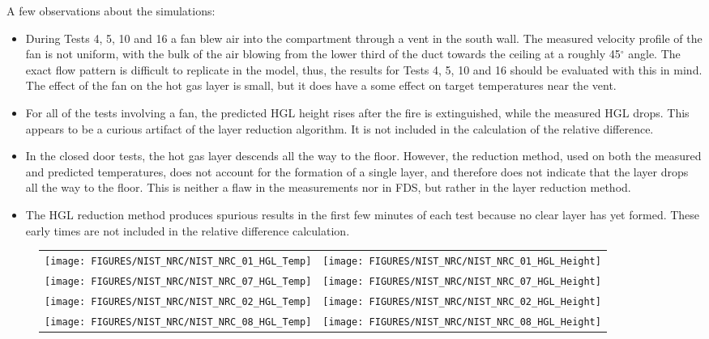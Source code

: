 A few observations about the simulations:
\begin{itemize}
\item During Tests 4, 5, 10 and 16 a fan blew air into the compartment through a vent in the south wall.
The measured velocity profile of the fan is not uniform, with the bulk of the air blowing from the lower third of the duct towards the ceiling at a
roughly 45$^\circ$ angle.  The exact flow pattern is difficult to replicate in the model, thus, the results for Tests 4, 5, 10 and 16 should be evaluated
with this in mind. The effect of the fan on the hot gas layer is small, but it does have a some effect on target temperatures near the vent.
\item For all of the tests involving a fan, the predicted HGL height rises after the fire is extinguished,
while the measured HGL drops.  This appears to be a curious artifact of the layer reduction algorithm. It is not included in the calculation of the
relative difference.
\item In the closed door tests, the hot gas layer descends all the way to the floor.
However, the reduction method, used on both the measured and predicted temperatures, does not account for the formation of a single layer, and
therefore does not indicate that the layer drops all the way to the floor. This is neither a flaw in the measurements nor in FDS, but rather in the
layer reduction method.
\item The HGL reduction method produces spurious results in the first few minutes of each test because no clear layer has yet formed.
These early times are not included in the relative difference calculation.
\end{itemize}

\newpage

\begin{figure}[p]
\begin{tabular*}{\textwidth}{l@{\extracolsep{\fill}}r}
\texttt{[image: FIGURES/NIST\_NRC/NIST\_NRC\_01\_HGL\_Temp]} &
\texttt{[image: FIGURES/NIST\_NRC/NIST\_NRC\_01\_HGL\_Height]} \\
\texttt{[image: FIGURES/NIST\_NRC/NIST\_NRC\_07\_HGL\_Temp]} &
\texttt{[image: FIGURES/NIST\_NRC/NIST\_NRC\_07\_HGL\_Height]} \\
\texttt{[image: FIGURES/NIST\_NRC/NIST\_NRC\_02\_HGL\_Temp]} &
\texttt{[image: FIGURES/NIST\_NRC/NIST\_NRC\_02\_HGL\_Height]} \\
\texttt{[image: FIGURES/NIST\_NRC/NIST\_NRC\_08\_HGL\_Temp]} &
\texttt{[image: FIGURES/NIST\_NRC/NIST\_NRC\_08\_HGL\_Height]}
\end{tabular*}
\end{figure}

